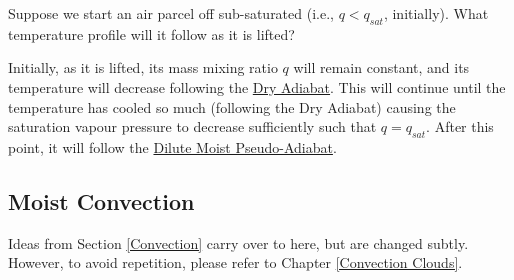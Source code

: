 Suppose we start an air parcel off sub-saturated (i.e., $q<q_{sat}$, initially). What temperature profile will it follow as it is lifted? 

Initially, as it is lifted, its mass mixing ratio $q$ will remain constant, and its temperature will decrease following the \hyperref[Dry Adiabat]{Dry Adiabat}. This will continue until the temperature has cooled so much (following the Dry Adiabat) causing the saturation vapour pressure to decrease sufficiently such that $q=q_{sat}$. After this point, it will follow the \hyperref[dilute moist adiabat]{Dilute Moist Pseudo-Adiabat}.

\subsection{Moist Convection}

Ideas from Section \ref{Convection} carry over to here, but are changed subtly. However, to avoid repetition, please refer to Chapter \ref{Convection Clouds}.
